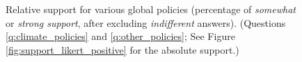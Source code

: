 \documentclass[12pt,english]{article}
\begin{document}
\begin{figure}
  \caption[Relative support for further global policies]{Relative support for various global policies (percentage of \textit{somewhat} or \textit{strong support}, after excluding \textit{indifferent} answers). (Questions \ref{q:climate_policies} and \ref{q:other_policies}; See Figure \ref{fig:support_likert_positive} for the absolute support.)%
  }
  \label{fig:support}
\end{figure} 
\end{document}
